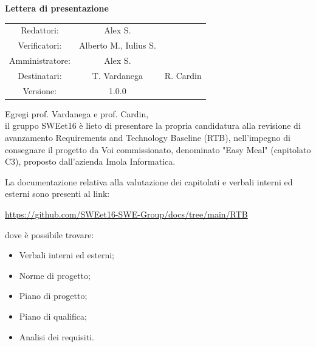 \documentclass[a4paper, 11pt]{article}
\begin{document}
\begin{center}
\begin{Huge}
        \textbf{Lettera di presentazione} \\
        \vspace{4mm}

\end{Huge}

\vspace{20mm}

\begin{large}
\begin{spacing}{1.4}
\begin{tabular}{c c c}
   Redattori: & Alex S. & \\
   Verificatori: & Alberto M., Iulius S. & \\
   Amministratore: & Alex S. & \\
   Destinatari: & T. Vardanega & R. Cardin \\
   Versione: & 1.0.0 &
\end{tabular}
\end{spacing}
\end{large}
\end{center}

\pagebreak

Egregi prof. Vardanega e prof. Cardin,\\
il gruppo SWEet16 è lieto di presentare la propria candidatura alla revisione di avanzamento Requirements and Technology Baseline (RTB), 
nell'impegno di consegnare il progetto da Voi commissionato, denominato "Easy Meal" (capitolato C3), proposto dall'azienda Imola Informatica.

\par

La documentazione relativa alla valutazione dei capitolati e verbali
interni ed esterni sono presenti al link:
\begin{center}
    \url{https://github.com/SWEet16-SWE-Group/docs/tree/main/RTB}
\end{center}
dove è possibile trovare:
\begin{itemize}
  \item Verbali interni ed esterni;
  \item Norme di progetto;
  \item Piano di progetto;
  \item Piano di qualifica;
  \item Analisi dei requisiti.
\end{itemize}
\end{document}
